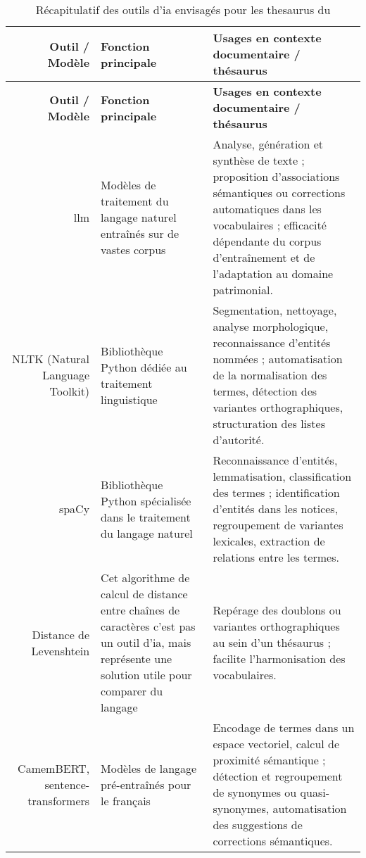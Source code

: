 \begin{longtable}{D E E}
	\caption{Récapitulatif des outils d'\ac{ia} envisagés pour les \gls{thesaurus} du \mae}
	\label{tab:recapIA}\\
	\hline\hline
	\textbf{Outil / Modèle} & \textbf{Fonction principale} & \textbf{Usages en contexte documentaire / thésaurus} \\
	\hline
	\endfirsthead
	
	\hline\hline
	\textbf{Outil / Modèle} & \textbf{Fonction principale} & \textbf{Usages en contexte documentaire / thésaurus} \\
	\hline
	\endhead
	
	\hline
	\endfoot
	
	\hline\hline
	\endlastfoot
	
	\ac{llm} & Modèles de traitement du langage naturel entraînés sur de vastes corpus & Analyse, génération et synthèse de texte ; proposition d’associations sémantiques ou corrections automatiques dans les vocabulaires ; efficacité dépendante du corpus d’entraînement et de l’adaptation au domaine patrimonial. \\
	NLTK (Natural Language Toolkit) & Bibliothèque Python dédiée au traitement linguistique & Segmentation, nettoyage, analyse morphologique, reconnaissance d’entités nommées ; automatisation de la normalisation des termes, détection des variantes orthographiques, structuration des listes d’autorité. \\
	spaCy & Bibliothèque Python spécialisée dans le traitement du langage naturel & Reconnaissance d’entités, lemmatisation, classification des termes ; identification d’entités dans les notices, regroupement de variantes lexicales, extraction de relations entre les termes. \\
	Distance de Levenshtein & Cet algorithme de calcul de distance entre chaînes de caractères  c'est pas un outil d'\ac{ia}, mais représente une solution utile pour comparer du langage & Repérage des doublons ou variantes orthographiques au sein d’un thésaurus ; facilite l’harmonisation des vocabulaires. \\
	CamemBERT, sentence-transformers & Modèles de langage pré-entraînés pour le français & Encodage de termes dans un espace vectoriel, calcul de proximité sémantique ; détection et regroupement de synonymes ou quasi-synonymes, automatisation des suggestions de corrections sémantiques. \\
\end{longtable}